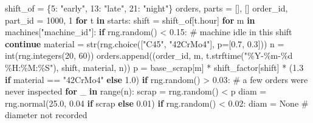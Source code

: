 \documentclass[
  letterpaper,
  DIV=11,
  numbers=noendperiod]{scrreprt}
\newenvironment{Shaded}{\begin{snugshade}}{\end{snugshade}}
\newcommand{\BuiltInTok}[1]{\textcolor[rgb]{0.00,0.23,0.31}{#1}}
\newcommand{\CommentTok}[1]{\textcolor[rgb]{0.37,0.37,0.37}{#1}}
\newcommand{\ControlFlowTok}[1]{\textcolor[rgb]{0.00,0.23,0.31}{\textbf{#1}}}
\newcommand{\DecValTok}[1]{\textcolor[rgb]{0.68,0.00,0.00}{#1}}
\newcommand{\FloatTok}[1]{\textcolor[rgb]{0.68,0.00,0.00}{#1}}
\newcommand{\KeywordTok}[1]{\textcolor[rgb]{0.00,0.23,0.31}{\textbf{#1}}}
\newcommand{\NormalTok}[1]{\textcolor[rgb]{0.00,0.23,0.31}{#1}}
\newcommand{\OperatorTok}[1]{\textcolor[rgb]{0.37,0.37,0.37}{#1}}
\newcommand{\SpecialCharTok}[1]{\textcolor[rgb]{0.37,0.37,0.37}{#1}}
\newcommand{\StringTok}[1]{\textcolor[rgb]{0.13,0.47,0.30}{#1}}
\newcommand{\VariableTok}[1]{\textcolor[rgb]{0.07,0.07,0.07}{#1}}
\begin{document}
\begin{Shaded}
\begin{Highlighting}[]
\NormalTok{    shift\_of }\OperatorTok{=}\NormalTok{ \{}\DecValTok{5}\NormalTok{: }\StringTok{"early"}\NormalTok{, }\DecValTok{13}\NormalTok{: }\StringTok{"late"}\NormalTok{, }\DecValTok{21}\NormalTok{: }\StringTok{"night"}\NormalTok{\}}
\NormalTok{    orders, parts }\OperatorTok{=}\NormalTok{ [], []}
\NormalTok{    order\_id, part\_id }\OperatorTok{=} \DecValTok{1000}\NormalTok{, }\DecValTok{1}
    \ControlFlowTok{for}\NormalTok{ t }\KeywordTok{in}\NormalTok{ starts:}
\NormalTok{        shift }\OperatorTok{=}\NormalTok{ shift\_of[t.hour]}
        \ControlFlowTok{for}\NormalTok{ m }\KeywordTok{in}\NormalTok{ machines[}\StringTok{"machine\_id"}\NormalTok{]:}
            \ControlFlowTok{if}\NormalTok{ rng.random() }\OperatorTok{\textless{}} \FloatTok{0.15}\NormalTok{:                      }\CommentTok{\# machine idle in this shift}
                \ControlFlowTok{continue}
\NormalTok{            material }\OperatorTok{=} \BuiltInTok{str}\NormalTok{(rng.choice([}\StringTok{"C45"}\NormalTok{, }\StringTok{"42CrMo4"}\NormalTok{], p}\OperatorTok{=}\NormalTok{[}\FloatTok{0.7}\NormalTok{, }\FloatTok{0.3}\NormalTok{]))}
\NormalTok{            n }\OperatorTok{=} \BuiltInTok{int}\NormalTok{(rng.integers(}\DecValTok{20}\NormalTok{, }\DecValTok{60}\NormalTok{))}
\NormalTok{            orders.append((order\_id, m, t.strftime(}\StringTok{"\%Y{-}\%m{-}}\SpecialCharTok{\%d}\StringTok{ \%H:\%M:\%S"}\NormalTok{), shift, material, n))}
\NormalTok{            p }\OperatorTok{=}\NormalTok{ base\_scrap[m] }\OperatorTok{*}\NormalTok{ shift\_factor[shift] }\OperatorTok{*}\NormalTok{ (}\FloatTok{1.3} \ControlFlowTok{if}\NormalTok{ material }\OperatorTok{==} \StringTok{"42CrMo4"} \ControlFlowTok{else} \FloatTok{1.0}\NormalTok{)}
            \ControlFlowTok{if}\NormalTok{ rng.random() }\OperatorTok{\textgreater{}} \FloatTok{0.03}\NormalTok{:                      }\CommentTok{\# a few orders were never inspected}
                \ControlFlowTok{for}\NormalTok{ \_ }\KeywordTok{in} \BuiltInTok{range}\NormalTok{(n):}
\NormalTok{                    scrap }\OperatorTok{=}\NormalTok{ rng.random() }\OperatorTok{\textless{}}\NormalTok{ p}
\NormalTok{                    diam }\OperatorTok{=}\NormalTok{ rng.normal(}\FloatTok{25.0}\NormalTok{, }\FloatTok{0.04} \ControlFlowTok{if}\NormalTok{ scrap }\ControlFlowTok{else} \FloatTok{0.01}\NormalTok{)}
                    \ControlFlowTok{if}\NormalTok{ rng.random() }\OperatorTok{\textless{}} \FloatTok{0.02}\NormalTok{:}
\NormalTok{                        diam }\OperatorTok{=} \VariableTok{None}                      \CommentTok{\# diameter not recorded}

\end{Highlighting}
\end{Shaded}
\end{document}
